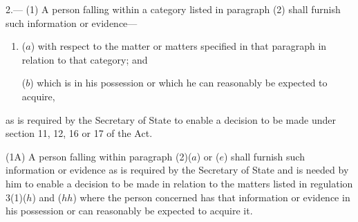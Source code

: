 \documentclass[a4paper,12pt]{article}
\begin{document}
2.—%
%
(1) A person falling within a category listed in paragraph (2) shall furnish such information or evidence—
\begin{enumerate}\item[]
($a$) with respect to the matter or matters specified in that paragraph in relation to that category; and

($b$) which is in his possession or which he can reasonably be expected to acquire,
\end{enumerate}
as is required by the Secretary of State to enable a decision to be made under section 11, 12, 16 or 17 of the Act.

(1A) A person falling within paragraph (2)($a$) or ($e$) shall furnish such information or evidence as is required by the Secretary of State and is needed by him to enable a decision to be made in relation to the matters listed in regulation 3(1)($h$) and ($hh$) where the person concerned has that information or evidence in his possession or can reasonably be expected to acquire it.
\end{document}
